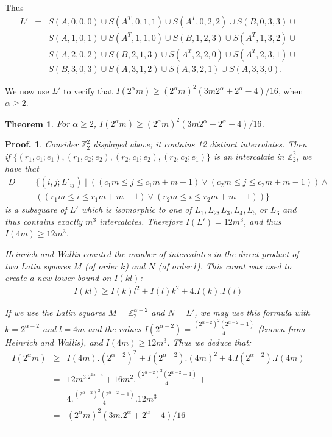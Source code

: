 \documentclass[12pt]{report}
\newtheorem{theorem}{Theorem}
\newtheorem{preproof}{{\bf Proof.}}
\newenvironment{proof}[1]{\begin{preproof}{\rm
               #1}\hfill{\rule[-0.5mm]{2mm}{2mm}}}{\end{preproof}}
\begin{document}
Thus 
\begin{eqnarray*}
L' &=& S(A,0,0,0) \cup S(A^T,0,1,1) \cup S(A^T,0,2,2) \cup S(B,0,3,3) \cup \\
&&      S(A,1,0,1) \cup S(A^T,1,1,0) \cup S(B,1,2,3) \cup S(A^T,1,3,2) \cup \\
&&      S(A,2,0,2) \cup S(B,2,1,3) \cup S(A^T,2,2,0) \cup S(A^T,2,3,1) \cup \\
&&      S(B,3,0,3) \cup S(A,3,1,2) \cup S(A,3,2,1) \cup S(A,3,3,0).
\end{eqnarray*}

We now use $L'$ to verify that  
$I(2^\alpha m) \geq (2^\alpha m)^2 (3m 2^\alpha+2^\alpha-4)/16$, when $\alpha \geq 2$.
\begin{theorem}
For $\alpha \geq 2$,
$I(2^\alpha m) \geq (2^\alpha m)^2 (3m 2^\alpha+2^\alpha-4)/16$.
\end{theorem}

\begin{proof}
{
Consider ${\mathbb Z}_2^2$ displayed above; it contains 12 distinct intercalates.
Then if $\{(r_1,c_1;e_1),(r_1,c_2;e_2),(r_2,c_1;e_2),(r_2,c_2;e_1)\}$
is an intercalate in ${\mathbb Z}_2^2$, we have that
\begin{eqnarray*}
D &=& \{ (i,j;L'_{ij}) \mid ((c_1m \leq j \leq c_1m+m-1) \vee (c_2m \leq j \leq c_2m+m-1)) \wedge \\
&& ((r_1m \leq i \leq r_1m+m-1) \vee (r_2m \leq i \leq r_2m+m-1)) \}
\end{eqnarray*}
is a subsquare of $L'$ which is isomorphic to one of $L_1, L_2, L_3, L_4, L_5$
or $L_6$ and thus contains exactly $m^3$ intercalates.  Therefore $I(L') = 12m^3$, and thus $I(4m) \geq 12m^3$.

Heinrich and Wallis counted the number of intercalates in the direct
product of two Latin squares $M$ (of order $k$) and $N$ (of order $l$).
This count was used to create a new lower bound on $I(kl)$:
\begin{eqnarray*}
I(kl) \geq I(k) l^2 + I(l) k^2 + 4.I(k).I(l)
\end{eqnarray*}

If we use the Latin squares $M = {\mathbb Z}_2^{\alpha-2}$ and $N = L'$,
we may use this formula with $k = 2^{\alpha-2}$ and $l = 4m$
and the values $I(2^{\alpha-2}) = \displaystyle{\frac{(2^{\alpha-2})^2
(2^{\alpha-2}-1)}{4}}$ (known from Heinrich and Wallis), and $I(4m)
\geq 12m^3$.  Thus we deduce that:
\begin{eqnarray*}
I(2^\alpha m) &\geq& I(4m).(2^{\alpha-2})^2 + I(2^{\alpha-2}).(4m)^2 + 4.I(2^{\alpha-2}).I(4m) \\
&=& 12m^3.2^{2\alpha-4} + 16m^2.\displaystyle{\frac{(2^{\alpha-2})^2 (2^{\alpha-2}-1)}{4}} +  \\
&& 4.\displaystyle{\frac{(2^{\alpha-2})^2 (2^{\alpha-2}-1)}{4}}.12m^3 \\
&=& (2^\alpha m)^2 (3m.2^\alpha + 2^\alpha - 4)/16
\end{eqnarray*}
}
\end{proof}
\end{document}
